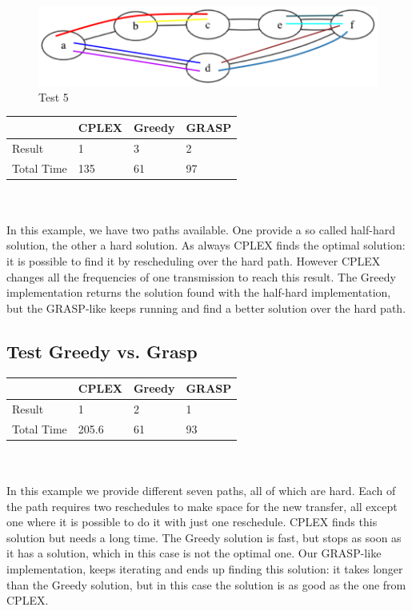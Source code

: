 \documentclass[11pt,a4paper]{article}
\begin{document}
\begin{figure}[H]
  \centering
    \includegraphics[scale=0.7]{inputSeeDifferencesGreedyCplex.png}
  \caption{Test 5}
  \label{fig:test5}
\end{figure}

\begin{tabular}{| l | l | l | l |}
\hline
 & CPLEX & Greedy & GRASP \\ \hline
Result & 1 & 3 & 2 \\ \hline
Total Time & 135 & 61 & 97 \\ \hline
\end{tabular}\\\\

In this example, we have two paths available. One provide a so called half-hard solution, the other a hard solution. As always CPLEX finds the optimal solution: it is possible to find it by rescheduling over the hard path. However CPLEX changes all the frequencies of one transmission to reach this result. The Greedy implementation returns the solution found with the half-hard implementation, but the GRASP-like keeps running and find a better solution over the hard path.

\subsection{Test Greedy vs. Grasp}

\begin{tabular}{| l | l | l | l |}
\hline
 & CPLEX & Greedy & GRASP \\ \hline
Result & 1 & 2 & 1 \\ \hline
Total Time & 205.6 & 61 & 93 \\ \hline
\end{tabular}\\\\

In this example we provide different seven paths, all of which are hard. Each of the path requires two reschedules to make space for the new transfer, all except one where it is possible to do it with just one reschedule. CPLEX finds this solution but needs a long time. The Greedy solution is fast, but stops as soon as it has a solution, which in this case is not the optimal one. Our GRASP-like implementation, keeps iterating and ends up finding this solution: it takes longer than the Greedy solution, but in this case the solution is as good as the one from CPLEX.
\end{document}
